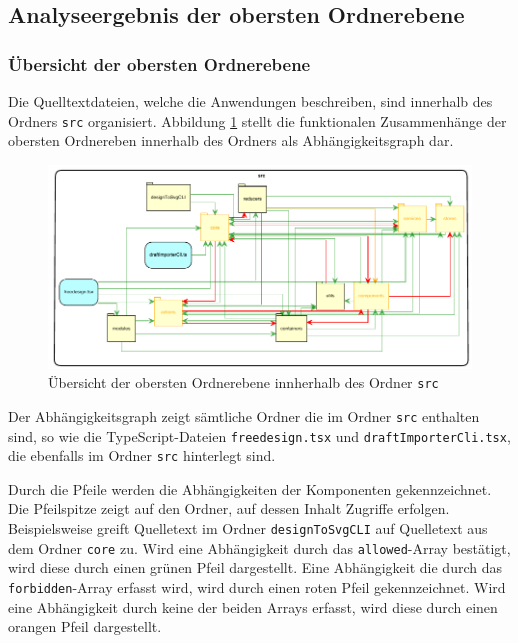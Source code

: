 \subsection{Analyseergebnis der obersten Ordnerebene}
\subsubsection{Übersicht der obersten Ordnerebene}
\label{sec:overview}
Die Quelltextdateien, welche die Anwendungen beschreiben, sind innerhalb des Ordners \lstinline|src| organisiert. 
Abbildung \ref{fig:obersteOrdnerebene} stellt die funktionalen Zusammenhänge der obersten Ordnereben innerhalb des Ordners als Abhängigkeitsgraph dar.  
\begin{figure}[H]
	\centering
    \caption{Übersicht der obersten Ordnerebene innherhalb des Ordner \lstinline|src|}
	\label{fig:obersteOrdnerebene}
	\includegraphics{diagrams/Ist-Architektur/Projektuebersicht.pdf}
\end{figure}


Der Abhängigkeitsgraph zeigt sämtliche Ordner die im Ordner \lstinline|src| enthalten sind, so wie die TypeScript-Dateien \lstinline|freedesign.tsx| und \lstinline|draftImporterCli.tsx|, die ebenfalls im Ordner \lstinline|src| hinterlegt sind.  

Durch die Pfeile werden die Abhängigkeiten der Komponenten gekennzeichnet. Die Pfeilspitze zeigt auf den Ordner, auf dessen Inhalt Zugriffe erfolgen. Beispielsweise greift Quelletext im Ordner \lstinline|designToSvgCLI| auf Quelletext aus dem Ordner \lstinline|core| zu.
Wird eine Abhängigkeit durch das \lstinline|allowed|-Array bestätigt, wird diese durch einen grünen Pfeil dargestellt. Eine Abhängigkeit die durch das \lstinline|forbidden|-Array erfasst wird, wird durch einen roten Pfeil gekennzeichnet. Wird eine Abhängigkeit durch keine der beiden Arrays erfasst, wird diese durch einen orangen Pfeil dargestellt.

